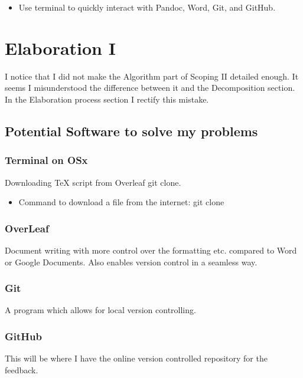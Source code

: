 \documentclass{article}
\begin{document}
\begin{itemize}
    \item Use terminal to quickly interact with Pandoc, Word, Git, and GitHub.
\end{itemize}

\section{Elaboration I}


\noindent
I notice that I did not make the Algorithm part of Scoping II detailed enough. It seems I misunderstood the difference between it and the Decomposition section. In the Elaboration process section I rectify this mistake.


\subsection{Potential Software to solve my problems}

\subsubsection{Terminal on OSx}

Downloading TeX script from Overleaf git clone.

\begin{itemize}
    \item Command to download a file from the internet: git clone
\end{itemize}

\subsubsection{OverLeaf}

Document writing with more control over the formatting etc. compared to Word or Google Documents. Also enables version control in a seamless way.

\subsubsection{Git}

A program which allows for local version controlling.

\subsubsection{GitHub}

This will be where I have the online version controlled repository for the feedback.
\end{document}
